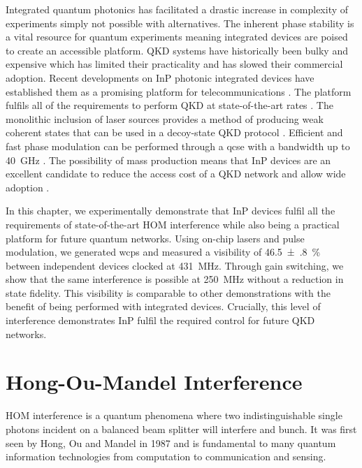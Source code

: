 Integrated quantum photonics has facilitated a drastic increase in complexity of experiments simply not possible with alternatives. The inherent phase stability is a vital resource for quantum experiments meaning integrated devices are poised to create an accessible platform. \Ac{QKD} systems have historically been bulky and expensive which has limited their practicality and has slowed their commercial adoption. Recent developments on \ac{InP} photonic integrated devices have established them as a promising platform for telecommunications \cite{smit2014}. The platform fulfils all of the requirements to perform \ac{QKD} at state-of-the-art rates \cite{Sibson2017InP}. The monolithic inclusion of laser sources provides a method of producing weak coherent states that can be used in a decoy-state QKD protocol \cite{Lo2005}. Efficient and fast phase modulation can be performed through a \ac{qcse} with a bandwidth up to \SI{40}{GHz} \cite{smit2014}. The possibility of mass production means that \ac{InP} devices are an excellent candidate to reduce the access cost of a \ac{QKD} network and allow wide adoption \cite{JeppixRoadmap}.

In this chapter, we experimentally demonstrate that \ac{InP} devices fulfil all the requirements of state-of-the-art \ac{HOM} interference while also being a practical platform for future quantum networks. Using on-chip lasers and pulse modulation, we generated \acp{wcp} and measured a visibility of \SI{46.5(8)}{\percent} between independent devices clocked at \SI{431}{MHz}. Through gain switching, we show that the same interference is possible at \SI{250}{MHz} without a reduction in state fidelity. This visibility is comparable to other demonstrations \cite{Yuan2014, Rubenok2013, Comandar2016} with the benefit of being performed with integrated devices. Crucially, this level of interference demonstrates \ac{InP} fulfil the required control for future \ac{QKD} networks.


\section{Hong-Ou-Mandel Interference}

\Ac{HOM} interference is a quantum phenomena where two indistinguishable single photons incident on a balanced beam splitter will interfere and bunch. It was first seen by Hong, Ou and Mandel in 1987 \cite{HOM} and is fundamental to many quantum information technologies from computation to communication and sensing. 

